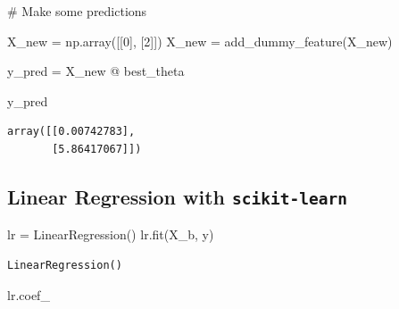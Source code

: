\documentclass[
]{report}
\newenvironment{Shaded}{\begin{snugshade}}{\end{snugshade}}
\newcommand{\CommentTok}[1]{\textcolor[rgb]{0.37,0.37,0.37}{#1}}
\newcommand{\DecValTok}[1]{\textcolor[rgb]{0.68,0.00,0.00}{#1}}
\newcommand{\NormalTok}[1]{\textcolor[rgb]{0.00,0.23,0.31}{#1}}
\newcommand{\OperatorTok}[1]{\textcolor[rgb]{0.37,0.37,0.37}{#1}}
\begin{document}
\begin{Shaded}
\begin{Highlighting}[]
\CommentTok{\# Make some predictions}

\NormalTok{X\_new }\OperatorTok{=}\NormalTok{ np.array([[}\DecValTok{0}\NormalTok{], [}\DecValTok{2}\NormalTok{]])}
\NormalTok{X\_new }\OperatorTok{=}\NormalTok{ add\_dummy\_feature(X\_new)}
\end{Highlighting}
\end{Shaded}

\begin{Shaded}
\begin{Highlighting}[]
\NormalTok{y\_pred }\OperatorTok{=}\NormalTok{ X\_new }\OperatorTok{@}\NormalTok{ best\_theta}
\end{Highlighting}
\end{Shaded}

\begin{Shaded}
\begin{Highlighting}[]
\NormalTok{y\_pred}
\end{Highlighting}
\end{Shaded}

\begin{verbatim}
array([[0.00742783],
       [5.86417067]])
\end{verbatim}

\hypertarget{linear-regression-with-scikit-learn}{%
\subsection{\texorpdfstring{Linear Regression with
\texttt{scikit-learn}}{Linear Regression with scikit-learn}}\label{linear-regression-with-scikit-learn}}

\begin{Shaded}
\begin{Highlighting}[]
\NormalTok{lr }\OperatorTok{=}\NormalTok{ LinearRegression()}
\NormalTok{lr.fit(X\_b, y)}
\end{Highlighting}
\end{Shaded}

\begin{verbatim}
LinearRegression()
\end{verbatim}

\begin{Shaded}
\begin{Highlighting}[]
\NormalTok{lr.coef\_}
\end{Highlighting}
\end{Shaded}
\end{document}
